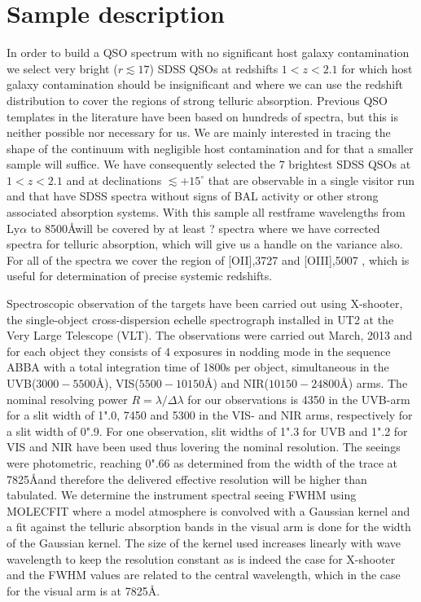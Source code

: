 \documentclass[iop]{emulateapj}
\begin{document}
\section{Sample description}
In order to build a QSO spectrum with no significant host galaxy contamination we select very bright ($r \lesssim 17$) SDSS QSOs at redshifts $1 < z < 2.1$ for which host galaxy contamination should be insignificant and where we can use the redshift distribution to cover the regions of strong telluric absorption. Previous QSO templates in the literature have been based on hundreds of spectra, but this is neither possible nor necessary for us. We are mainly interested in tracing the shape of the continuum with negligible host contamination and for that a smaller sample will suffice. We have consequently selected the 7 brightest SDSS QSOs at $1 < z < 2.1$ and at declinations $\lesssim +15^\circ$ that are observable in a single visitor run and that have SDSS spectra without signs of BAL activity or other strong associated absorption systems. With this sample all restframe wavelengths from Ly$\alpha$ to 8500\AA will be covered by at least ? spectra where we have corrected spectra for telluric absorption, which will give us a handle on the variance also. For all of the spectra we cover the region of [OII],3727 and [OIII],5007 , which is useful for determination of precise systemic redshifts.

Spectroscopic observation of the targets have been carried out using X-shooter, the single-object cross-dispersion echelle spectrograph installed in UT2 at the Very Large Telescope (VLT). The observations were carried out March, 2013 and for each object they consists of 4 exposures in nodding mode in the sequence ABBA with a total integration time of 1800s per object, simultaneous in the UVB($3000 - 5500$\AA), VIS($5500 - 10150$\AA)  and NIR($10150 - 24800$\AA) arms. The nominal resolving power $R = \lambda / \Delta \lambda$ for our observations is 4350 in the UVB-arm for a slit width of 1".0, 7450 and 5300 in the VIS- and NIR arms, respectively for a slit width of 0".9. For one observation, slit widths of 1".3 for UVB and 1".2 for VIS and NIR have been used thus lovering the nominal resolution. The seeings were photometric, reaching 0".66 as determined from the width of the trace at 7825\AA and therefore the delivered effective resolution will be higher than tabulated. We determine the instrument spectral seeing FWHM using MOLECFIT where a model atmosphere is convolved with a Gaussian kernel and a fit against the telluric absorption bands in the visual arm is done for the width of the Gaussian kernel. The size of the kernel used increases linearly with wave wavelength to keep the resolution constant as is indeed the case for X-shooter and the FWHM values are related to the central wavelength, which in the case for the visual arm is at 7825\AA. 
\end{document}
